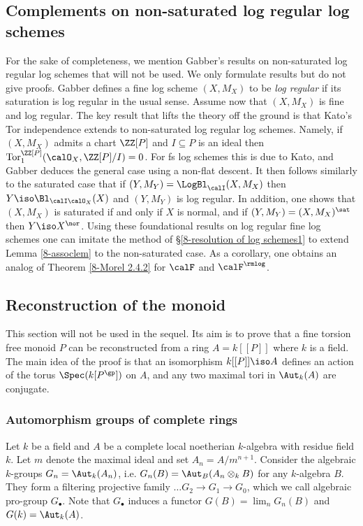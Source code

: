 \documentclass[10pt]{../fichiers-configuration-latex/smfart}
\begin{document}
\subsection{Complements on non-saturated log regular log
schemes}\label{8-nonsatursec} For the sake of completeness, we
mention Gabber's results on non-saturated log regular log schemes
that will not be used. We only formulate results but do not give
proofs. Gabber defines a fine log scheme $(X,M_X)$ to be {\em log
regular} if its saturation is log regular in the usual sense. Assume
now that $(X,M_X)$ is fine and log regular. The key result that
lifts the theory off the ground is that Kato's Tor independence
extends to non-saturated log regular log schemes. Namely, if
$(X,M_X)$ admits a chart $\ZZ[P]$ and $I\subseteq P$ is an
ideal then ${\rm Tor}_1^{\ZZ[P]}(\calO_X,\ZZ[P]/I)=0$. For fs
log schemes this is due to Kato, and Gabber deduces the general
case using a non-flat descent. It then follows similarly to
the saturated case that if $(Y,M_Y)=\LogBl_\calI(X,M_X)$ then
$Y\iso\Bl_{\calI\calO_X}(X)$ and $(Y,M_Y)$ is log regular. In
addition, one shows that $(X,M_X)$ is saturated if and only if $X$ is
normal, and if $(Y,M_Y)=(X,M_X)^\sat$ then $Y\iso X^\nor$. Using
these foundational results on log regular fine log schemes one can
imitate the method of \S\ref{8-resolution of log schemes1} to extend
Lemma \ref{8-assoclem} to the non-saturated case. As a corollary,
one obtains an analog of Theorem \ref{8-Morel 2.4.2} for $\calF$
and $\calF^\rmlog$.

\subsection{Reconstruction of the monoid}\label{8-reconstrsec}
This section will not be used in the sequel. Its aim is to prove
that a fine torsion free monoid $P$ can be reconstructed from a ring
$A=k[[P]]$ where $k$ is a field. The main idea of the proof is that
an isomorphism $k[[P]]\iso A$ defines an action of the torus
$\Spec(k[P^\gp])$ on $A$, and any two maximal tori in $\Aut_k(A)$
are conjugate.

\subsubsection{Automorphism groups of complete
rings}\label{8-automsec} Let $k$ be a field and $A$ be a complete
local noetherian $k$-algebra with residue field $k$. Let $m$ denote
the maximal ideal and set $A_n=A/m^{n+1}$. Consider the algebraic
$k$-groups $G_n=\Aut_k(A_n)$, i.e. $G_n(B)=\Aut_B(A_n\otimes_kB)$
for any $k$-algebra $B$. They form a filtering projective family
$\dots G_2\to G_1\to G_0$, which we call algebraic pro-group
$G_\bullet$. Note that $G_\bullet$ induces a functor $G(B)=\lim_n G_n(B)$
and $G(k)=\Aut_k(A)$.
\end{document}
